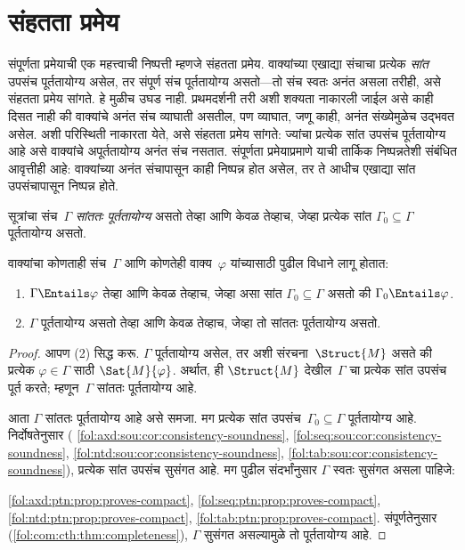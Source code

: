 \section{संहतता प्रमेय}\label{fol:com:com:sec}

संपूर्णता प्रमेयाची एक महत्त्वाची निष्पत्ती म्हणजे संहतता प्रमेय.
वाक्यांच्या एखाद्या संचाचा प्रत्येक \emph{सांत} उपसंच पूर्ततायोग्य असेल,
तर संपूर्ण संच पूर्ततायोग्य असतो---तो संच स्वतः अनंत असला तरीही, असे
संहतता प्रमेय सांगते. हे मुळीच उघड नाही. प्रथमदर्शनी तरी अशी शक्यता
नाकारली जाईल असे काही दिसत नाही की वाक्यांचे अनंत संच व्याघाती
असतील, पण व्याघात, जणू काही, अनंत संख्येमुळेच उद्भवत असेल. अशी परिस्थिती
नाकारता येते, असे संहतता प्रमेय सांगते: ज्यांचा प्रत्येक सांत उपसंच
पूर्ततायोग्य आहे असे वाक्यांचे अपूर्ततायोग्य अनंत संच नसतात.
संपूर्णता प्रमेयाप्रमाणे याची तार्किक निष्पन्नतेशी संबंधित आवृत्तीही आहे:
वाक्यांच्या अनंत संचापासून काही निष्पन्न होत असेल, तर ते आधीच
एखाद्या सांत उपसंचापासून निष्पन्न होते.

\begin{defn}
  सूत्रांचा संच~$\Gamma$ \emph{सांततः पूर्ततायोग्य} असतो तेव्हा आणि
  केवळ तेव्हाच, जेव्हा प्रत्येक सांत $\Gamma_0 \subseteq \Gamma$
  पूर्ततायोग्य असतो.
\end{defn}

\begin{thm}[संहतता प्रमेय]
\label{fol:com:com:thm:compactness}
वाक्यांचा कोणताही संच~$\Gamma$ आणि कोणतेही वाक्य~$\varphi$ यांच्यासाठी पुढील
विधाने लागू होतात:
\begin{enumerate}
  \item $\Gamma \Entails \varphi$ तेव्हा आणि केवळ तेव्हाच, जेव्हा असा सांत
    $\Gamma_0 \subseteq \Gamma$ असतो की $\Gamma_0 \Entails \varphi$.
  \item $\Gamma$ पूर्ततायोग्य असतो तेव्हा आणि केवळ तेव्हाच, जेव्हा तो
    सांततः पूर्ततायोग्य असतो.
\end{enumerate}
\end{thm}

\begin{proof}
आपण (2) सिद्ध करू. $\Gamma$ पूर्ततायोग्य असेल, तर अशी
संरचना~$\Struct{M}$
असते की प्रत्येक $\varphi \in \Gamma$ साठी
$\Sat{M}{\varphi}$. अर्थात, ही
$\Struct{M}$ देखील~$\Gamma$ चा प्रत्येक सांत
उपसंच पूर्त करते; म्हणून~$\Gamma$ सांततः पूर्ततायोग्य आहे.

आता $\Gamma$ सांततः पूर्ततायोग्य आहे असे समजा. मग प्रत्येक सांत
उपसंच~$\Gamma_0 \subseteq \Gamma$ पूर्ततायोग्य आहे. निर्दोषतेनुसार
(
  \ref{fol:axd:sou:cor:consistency-soundness}, \ref{fol:seq:sou:cor:consistency-soundness}, \ref{fol:ntd:sou:cor:consistency-soundness}, \ref{fol:tab:sou:cor:consistency-soundness}),
प्रत्येक सांत उपसंच सुसंगत आहे. मग पुढील संदर्भांनुसार $\Gamma$ स्वतः
सुसंगत असला पाहिजे:

  \ref{fol:axd:ptn:prop:proves-compact}, \ref{fol:seq:ptn:prop:proves-compact}, \ref{fol:ntd:ptn:prop:proves-compact}, \ref{fol:tab:ptn:prop:proves-compact}.
संपूर्णतेनुसार (\ref{fol:com:cth:thm:completeness}), $\Gamma$ सुसंगत
असल्यामुळे तो पूर्ततायोग्य आहे.
\end{proof}


